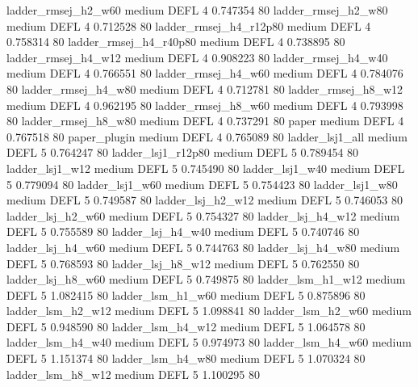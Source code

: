    ladder_rmsej_h2_w60     medium     DEFL                 4 0.747354 80
   ladder_rmsej_h2_w80     medium     DEFL                 4 0.712528 80
ladder_rmsej_h4_r12p80     medium     DEFL                 4 0.758314 80
ladder_rmsej_h4_r40p80     medium     DEFL                 4 0.738895 80
   ladder_rmsej_h4_w12     medium     DEFL                 4 0.908223 80
   ladder_rmsej_h4_w40     medium     DEFL                 4 0.766551 80
   ladder_rmsej_h4_w60     medium     DEFL                 4 0.784076 80
   ladder_rmsej_h4_w80     medium     DEFL                 4 0.712781 80
   ladder_rmsej_h8_w12     medium     DEFL                 4 0.962195 80
   ladder_rmsej_h8_w60     medium     DEFL                 4 0.793998 80
   ladder_rmsej_h8_w80     medium     DEFL                 4 0.737291 80
                 paper     medium     DEFL                 4 0.767518 80
          paper_plugin     medium     DEFL                 4 0.765089 80
       ladder_lsj1_all     medium     DEFL                 5 0.764247 80
    ladder_lsj1_r12p80     medium     DEFL                 5 0.789454 80
       ladder_lsj1_w12     medium     DEFL                 5 0.745490 80
       ladder_lsj1_w40     medium     DEFL                 5 0.779094 80
       ladder_lsj1_w60     medium     DEFL                 5 0.754423 80
       ladder_lsj1_w80     medium     DEFL                 5 0.749587 80
     ladder_lsj_h2_w12     medium     DEFL                 5 0.746053 80
     ladder_lsj_h2_w60     medium     DEFL                 5 0.754327 80
     ladder_lsj_h4_w12     medium     DEFL                 5 0.755589 80
     ladder_lsj_h4_w40     medium     DEFL                 5 0.740746 80
     ladder_lsj_h4_w60     medium     DEFL                 5 0.744763 80
     ladder_lsj_h4_w80     medium     DEFL                 5 0.768593 80
     ladder_lsj_h8_w12     medium     DEFL                 5 0.762550 80
     ladder_lsj_h8_w60     medium     DEFL                 5 0.749875 80
     ladder_lsm_h1_w12     medium     DEFL                 5 1.082415 80
     ladder_lsm_h1_w60     medium     DEFL                 5 0.875896 80
     ladder_lsm_h2_w12     medium     DEFL                 5 1.098841 80
     ladder_lsm_h2_w60     medium     DEFL                 5 0.948590 80
     ladder_lsm_h4_w12     medium     DEFL                 5 1.064578 80
     ladder_lsm_h4_w40     medium     DEFL                 5 0.974973 80
     ladder_lsm_h4_w60     medium     DEFL                 5 1.151374 80
     ladder_lsm_h4_w80     medium     DEFL                 5 1.070324 80
     ladder_lsm_h8_w12     medium     DEFL                 5 1.100295 80
